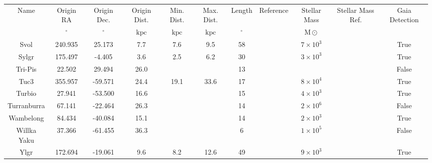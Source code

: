 \begin{table}
\begin{tabular}{ccccccccccc}
\hline \hline
Name & Origin RA & Origin Dec. & Origin Dist. & Min. Dist. & Max. Dist. & Length & Reference & Stellar Mass & Stellar Mass Ref. & Gaia Detection \\
 & $\mathrm{{}^{\circ}}$ & $\mathrm{{}^{\circ}}$ & $\mathrm{kpc}$ & $\mathrm{kpc}$ & $\mathrm{kpc}$ & $\mathrm{{}^{\circ}}$ &  & $\mathrm{M{\odot}}$ &  &  \\
\hline
Svol & 240.935 & 25.173 & 7.7 & 7.6 & 9.5 & 58 & \citet{ibata:2023} & $7 \times 10^{3}$ &  & True \\
Sylgr & 175.497 & -4.405 & 3.6 & 2.5 & 6.2 & 30 & \citet{ibata:2023} & $3 \times 10^{3}$ &  & True \\
Tri-Pis & 22.502 & 29.494 & 26.0 & & & 13 & \citet{bonaca:2012} & &  & False \\
Tuc3 & 355.957 & -59.571 & 24.4 & 19.1 & 33.6 & 17 & \citet{ibata:2023} & $8 \times 10^{4}$ &  & True \\
Turbio & 27.941 & -53.500 & 16.6 & & & 15 & \citet{shipp:2018} & $4 \times 10^{3}$ & \citet{shipp:2018} & True \\
Turranburra & 67.141 & -22.464 & 26.3 & & & 14 & \citet{shipp:2019} & $2 \times 10^{6}$ & \citet{shipp:2018} & False \\
Wambelong & 84.434 & -40.084 & 15.1 & & & 14 & \citet{shipp:2018} & $2 \times 10^{3}$ & \citet{shipp:2018} & True \\
Willka Yaku & 37.366 & -61.455 & 36.3 & & & 6 & \citet{shipp:2018} & $1 \times 10^{5}$ & \citet{shipp:2018} & False \\
Ylgr & 172.694 & -19.061 & 9.6 & 8.2 & 12.6 & 49 & \citet{ibata:2023} & $9 \times 10^{3}$ &  & True \\
\hline \hline
\end{tabular}
\end{table}
